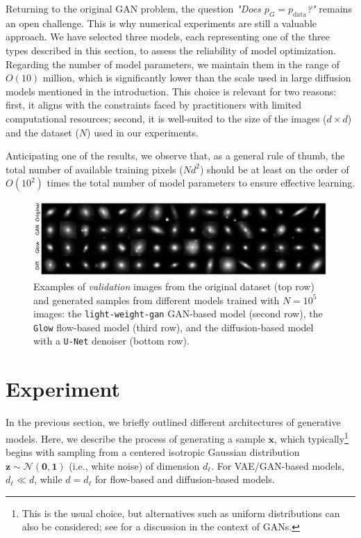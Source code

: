 \documentclass[fleqn,usenatbib]{mnras}
\begin{document}
{Returning to the original GAN problem, the question \textit{"Does $p_G = p_{\text{data}}$?"} remains an open challenge. This is why numerical experiments are still a valuable approach. We have selected three models, each representing one of the three types described in this section, to assess the reliability of model optimization. Regarding the number of model parameters, we maintain them in the range of $O(10)$ million, which is significantly lower than the scale used in large diffusion models mentioned in the introduction. This choice is relevant for two reasons: first, it aligns with the constraints faced by practitioners with limited computational resources; second, it is well-suited to the size of the images ($d \times d$) and the dataset ($N$) used in our experiments.  

Anticipating one of the results, we observe that, as a general rule of thumb, the total number of available training pixels ($N d^2$) should be at least on the order of $O(10^2)$ times the total number of model parameters to ensure effective learning.
}



%
\begin{figure}
    \centering
        \includegraphics[width=0.8\linewidth]{fig-model_sample_images.pdf}
    \caption{Examples of \textit{validation} images from the original dataset (top row) and generated samples from different models trained with $N = 10^5$ images: the \texttt{light-weight-gan} GAN-based model (second row), the \texttt{Glow} flow-based model (third row), and the diffusion-based model with a \texttt{U-Net} denoiser (bottom row).}
    \label{fig-Original-Glow-UNet-Gan-samples}
\end{figure}

%
\section{Experiment}
\label{sec-experiment}
%
In the previous section, we briefly outlined different architectures of generative models. Here, we describe the process of generating a sample $\bm{x}$, which typically\footnote{This is the usual choice, but alternatives such as uniform distributions can also be considered; see \cite{Brock2019} for a discussion in the context of GANs.} begins with sampling from a centered isotropic Gaussian distribution $\bm{z}\sim \mathcal{N}(\bm{0}, \bm{1})$ (i.e., white noise) of dimension $d_\ell$. For VAE/GAN-based models, $d_\ell \ll d$, while $d = d_\ell$ for flow-based and diffusion-based models. 
\end{document}
